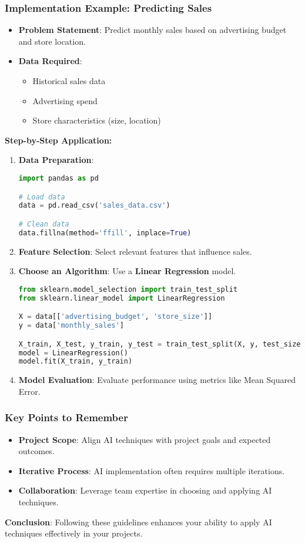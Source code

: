 \documentclass[aspectratio=169]{beamer}
\begin{document}
\begin{frame}[fragile]
  \frametitle{Implementation Example: Predicting Sales}
  \begin{itemize}
    \item \textbf{Problem Statement}: Predict monthly sales based on advertising budget and store location.
    \item \textbf{Data Required}: 
      \begin{itemize}
        \item Historical sales data
        \item Advertising spend
        \item Store characteristics (size, location)
      \end{itemize}
  \end{itemize}
  \textbf{Step-by-Step Application:}
  \begin{enumerate}
    \item \textbf{Data Preparation}:
    \begin{lstlisting}[language=Python]
import pandas as pd

# Load data
data = pd.read_csv('sales_data.csv')

# Clean data
data.fillna(method='ffill', inplace=True)
    \end{lstlisting}
    
    \item \textbf{Feature Selection}: Select relevant features that influence sales.
    
    \item \textbf{Choose an Algorithm}: Use a \textbf{Linear Regression} model.
    \begin{lstlisting}[language=Python]
from sklearn.model_selection import train_test_split
from sklearn.linear_model import LinearRegression

X = data[['advertising_budget', 'store_size']]
y = data['monthly_sales']

X_train, X_test, y_train, y_test = train_test_split(X, y, test_size=0.2, random_state=42)
model = LinearRegression()
model.fit(X_train, y_train)
    \end{lstlisting}

    \item \textbf{Model Evaluation}: Evaluate performance using metrics like Mean Squared Error.
  \end{enumerate}
\end{frame}

\begin{frame}[fragile]
  \frametitle{Key Points to Remember}
  \begin{itemize}
    \item \textbf{Project Scope}: Align AI techniques with project goals and expected outcomes.
    \item \textbf{Iterative Process}: AI implementation often requires multiple iterations.
    \item \textbf{Collaboration}: Leverage team expertise in choosing and applying AI techniques.
  \end{itemize}
  \textbf{Conclusion}: Following these guidelines enhances your ability to apply AI techniques effectively in your projects.
\end{frame}
\end{document}
